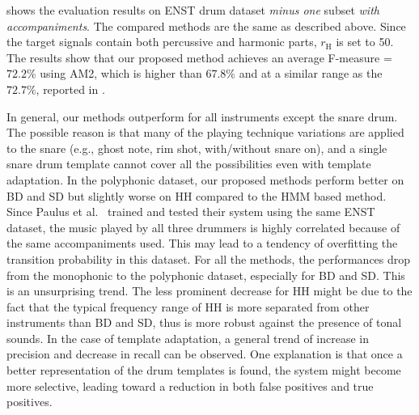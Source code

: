 \documentclass{article}
\begin{document}
 shows the evaluation results on ENST drum dataset \textit{minus one} subset \textit{with accompaniments}. The compared methods are the same as described above. Since the target signals contain both percussive and harmonic parts, $r_\mathrm{H}$ is set to 50. The results show that our proposed method achieves an average F-measure = $72.2\%$ using AM2, which is higher than $67.8\%$ \cite{gillet_transcription_2008} and at a similar range as the $72.7\%$, reported in \cite{Paulus2009a}. %

In general, our methods outperform \cite{gillet_transcription_2008} for all instruments except the snare drum. The possible reason is that many of the playing technique variations are applied to the snare (e.g., ghost note, rim shot, with/without snare on), and a single snare drum template cannot cover all the possibilities even with template adaptation. In the polyphonic dataset, our proposed methods perform better on BD and SD but slightly worse on HH compared to the HMM based method\cite{Paulus2009a}. Since Paulus et al.\ \cite{Paulus2009a} trained and tested their system using the same ENST dataset, the music played by all three drummers is highly correlated because of the same accompaniments used. This may lead to a tendency of overfitting the transition probability in this dataset.
For all the methods, the performances drop from the monophonic to the polyphonic dataset, especially for BD and SD. This is an unsurprising trend. The less prominent decrease for HH might be due to the fact that the typical frequency range of HH is more separated from other instruments than BD and SD, thus is more robust against the presence of tonal sounds. In the case of template adaptation, a general trend of increase in precision and decrease in recall can be observed. One explanation is that once a better representation of the drum templates is found, the system might become more selective, leading toward a reduction in both false positives and true positives. 
\end{document}

